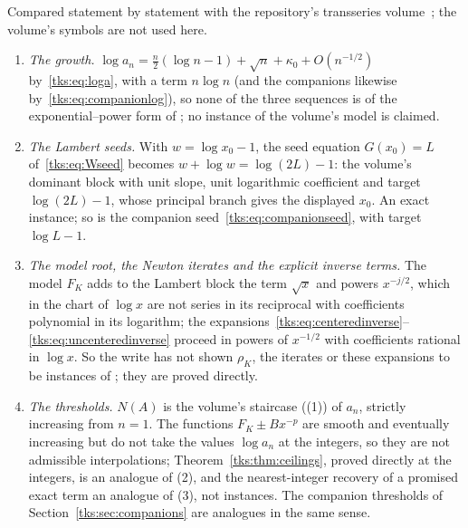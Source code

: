 \begin{remark}\label{tks:rem:transseries}
Compared statement by statement with the repository's transseries
volume~\cite{TSvol}; the volume's symbols are not used here.
\begin{enumerate}\raggedright
\item \emph{The growth.} $\log a_n=\frac n2(\log n-1)+\sqrt n+\kappa_0+O(n^{-1/2})$
by~\eqref{tks:eq:loga}, with a term $n\log n$ (and the companions likewise
by~\eqref{tks:eq:companionlog}), so none of the three sequences is of the
exponential--power form of ; no instance of the volume's
model is claimed.
\item \emph{The Lambert seeds.} With $w=\log x_0-1$, the seed
equation $G(x_0)=L$ of~\eqref{tks:eq:Wseed} becomes $w+\log w=\log(2L)-1$:
the volume's dominant block  with unit slope, unit
logarithmic coefficient and target $\log(2L)-1$, whose principal branch gives
the displayed $x_0$. An exact instance; so is the companion
seed~\eqref{tks:eq:companionseed}, with target $\log L-1$.
\item \emph{The model root, the Newton iterates and the explicit inverse
terms.} The model $F_K$ adds to the Lambert block the term $\sqrt x$ and
powers $x^{-j/2}$, which in the chart of $\log x$ are not series in its
reciprocal with coefficients polynomial in its logarithm; the
expansions~\eqref{tks:eq:centeredinverse}--\eqref{tks:eq:uncenteredinverse}
proceed in powers of $x^{-1/2}$ with coefficients rational in $\log x$. So
the write has not shown $\rho_K$, the iterates or these expansions to be
instances of ; they are proved directly.
\item \emph{The thresholds.} $N(A)$ is the volume's staircase
((1)) of $a_n$, strictly increasing from $n=1$.
The functions $F_K\pm Bx^{-p}$ are smooth and eventually increasing but do not
take the values $\log a_n$ at the integers, so they are not admissible
interpolations; Theorem~\ref{tks:thm:ceilings}, proved directly at the
integers, is an analogue of (2), and the
nearest-integer recovery of a promised exact term an analogue of
(3), not instances. The companion thresholds of
Section~\ref{tks:sec:companions} are analogues in the same sense.
\end{enumerate}
\end{remark}
